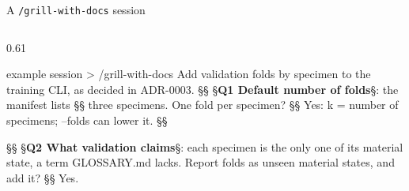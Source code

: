 \begin{frame}[fragile,source={Pocock (2026), mattpocock/skills v1.3.1: grill-with-docs, grilling, domain-modeling}]{A \texttt{/grill-with-docs} session}
  \edef\colgap{\the\dimexpr0.03\textwidth\relax}
  \begin{columns}[T,onlytextwidth]
    \begin{column}{0.61\textwidth}
\begin{terminal}[basicstyle=\ttfamily\fontsize{7}{8}\selectfont]{example session}
> /grill-with-docs Add validation folds by specimen to the
  training CLI, as decided in ADR-0003.
§\textcolor{termred}{\smash{\faQuestionCircle}}§ §\textbf{Q1 Default number of folds}§: the manifest lists §§
  three specimens. One fold per specimen?
§\textcolor{termblue}{\smash{\faArrowRight}}§ Yes: k = number of specimens; --folds can lower it. §§

§\textcolor{termred}{\smash{\faQuestionCircle}}§ §\textbf{Q2 What validation claims}§: each specimen is the only
  one of its material state, a term GLOSSARY.md lacks.
  Report folds as unseen material states, and add it?
§\textcolor{termblue}{\smash{\faArrowRight}}§ Yes.


\end{terminal}
\end{column}
\end{columns}
\end{frame}
